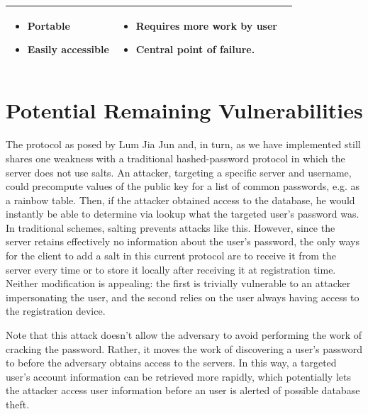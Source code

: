 \documentclass[11pt]{article}
\begin{document}
\begin{center}
\begin{tabular}{|  p{6cm} | p{5cm} | p{5cm} |}
    \begin{itemize}[leftmargin=*]
      \item Portable
      \item Easily accessible
    \end{itemize}

    &

    \begin{itemize}[leftmargin=*]
      \item Requires more work by user
      \item Central point of failure.
    \end{itemize}
    
    \\ \hline
    
    \end{tabular}
\end{center}

\normalsize

\section{Potential Remaining Vulnerabilities}

The protocol as posed by Lum Jia Jun and, in turn, as we have implemented still shares one weakness with a traditional hashed-password protocol in which the server does not use salts.  An attacker, targeting a specific server and username, could precompute values of the public key for a list of common passwords, e.g. as a rainbow table.  Then, if the attacker obtained access to the database, he would instantly be able to determine via lookup what the targeted user's password was.  In traditional schemes, salting prevents attacks like this.  However, since the server retains effectively no information about the user's password, the only ways for the client to add a salt in this current protocol are to receive it from the server every time or to store it locally after receiving it at registration time.  Neither modification is appealing: the first is trivially vulnerable to an attacker impersonating the user, and the second relies on the user always having access to the registration device.

Note that this attack doesn't allow the adversary to avoid performing the work of cracking the password.  Rather, it moves the work of discovering a user's password to before the adversary obtains access to the servers.  In this way, a targeted user's account information can be retrieved more rapidly, which potentially lets the attacker access user information before an user is alerted of possible database theft.
\end{document}
